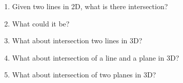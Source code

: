 \documentclass[12pt]{amsart}
\begin{document}
\begin{question}
    \begin{enumerate}
        \item Given two lines in 2D, what is there intersection? 
        \item What could it be?
        \item What about intersection two lines in 3D?
        \item What about intersection of a line and a plane in 3D?
        \item What about intersection of two planes in 3D?
    \end{enumerate}
\end{question}

\printbibliography 
%
%
\end{document}
